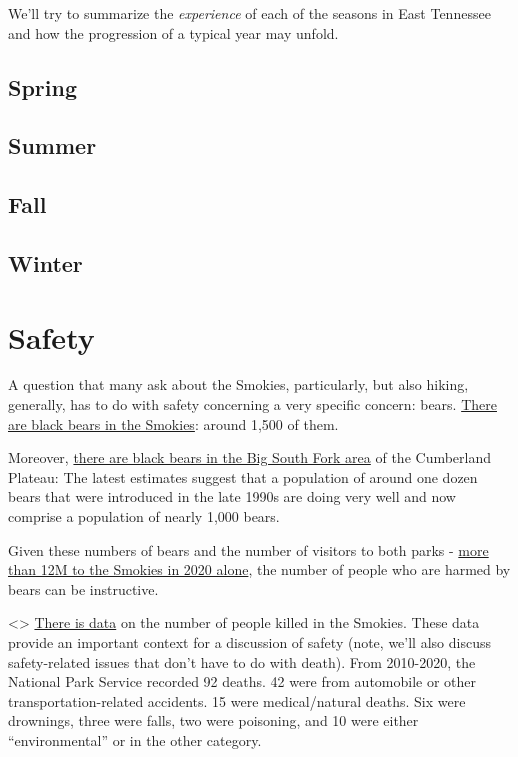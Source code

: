 \documentclass[
]{book}
\begin{document}
We'll try to summarize the \emph{experience} of each of the seasons in East Tennessee and how the progression of a typical year may unfold.

\hypertarget{spring-1}{%
\subsection{Spring}\label{spring-1}}

\hypertarget{summer-1}{%
\subsection{Summer}\label{summer-1}}

\hypertarget{fall-1}{%
\subsection{Fall}\label{fall-1}}

\hypertarget{winter-1}{%
\subsection{Winter}\label{winter-1}}

\hypertarget{safety}{%
\section{Safety}\label{safety}}

A question that many ask about the Smokies, particularly, but also hiking, generally, has to do with safety concerning a very specific concern: bears. \href{https://www.nps.gov/grsm/learn/nature/black-bears.htm}{There are black bears in the Smokies}: around 1,500 of them.

Moreover, \href{https://trace.tennessee.edu/cgi/viewcontent.cgi?article=7040\&context=utk_gradthes}{there are black bears in the Big South Fork area} of the Cumberland Plateau: The latest estimates suggest that a population of around one dozen bears that were introduced in the late 1990s are doing very well and now comprise a population of nearly 1,000 bears.

Given these numbers of bears and the number of visitors to both parks - \href{https://www.nps.gov/grsm/learn/news/park-experiences-more-than-12-million-visits-in-2020.htm}{more than 12M to the Smokies in 2020 alone}, the number of people who are harmed by bears can be instructive.

\textless\textgreater{} \href{https://outforia.com/danger-parks/\#all-data}{There is data} on the number of people killed in the Smokies. These data provide an important context for a discussion of safety (note, we'll also discuss safety-related issues that don't have to do with death). From 2010-2020, the National Park Service recorded 92 deaths. 42 were from automobile or other transportation-related accidents. 15 were medical/natural deaths. Six were drownings, three were falls, two were poisoning, and 10 were either ``environmental'' or in the other category.
\end{document}
